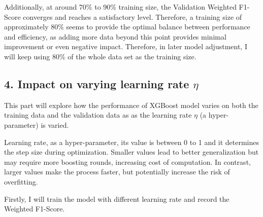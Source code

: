 \documentclass[
]{article}
\begin{document}
Additionally, at around 70\% to 90\% training size, the Validation
Weighted F1-Score converges and reaches a satisfactory level. Therefore,
a training size of approximately 80\% seems to provide the optimal
balance between performance and efficiency, as adding more data beyond
this point provides minimal improvement or even negative impact.
Therefore, in later model adjustment, I will keep using 80\% of the
whole data set as the training size.

\subsection{\texorpdfstring{4. Impact on varying learning rate
\(\eta\)}{4. Impact on varying learning rate \textbackslash eta}}\label{impact-on-varying-learning-rate-eta}

This part will explore how the performance of XGBoost model varies on
both the training data and the validation data as as the learning rate
\(\eta\) (a hyper-parameter) is varied.

Learning rate, as a hyper-parameter, its value is between 0 to 1 and it
determines the step size during optimization. Smaller values lead to
better generalization but may require more boosting rounds, increasing
cost of computation. In contrast, larger values make the process faster,
but potentially increase the risk of overfitting.

Firstly, I will train the model with different learning rate and record
the Weighted F1-Score.
\end{document}
